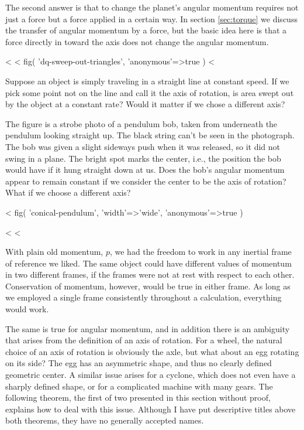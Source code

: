 The second answer is that to change the planet's angular
momentum requires not just a force but a force applied in a
certain way. In section \ref{sec:torque} we discuss the transfer of
angular momentum by a force, but the basic idea here is that
a force directly in toward the axis does not change
the angular momentum.

\startdqs

<%
<%
  fig(
    'dq-sweep-out-triangles',
    {
      'anonymous'=>true
    }
  )
<%
\begin{dq}\label{dq:sweep-out-triangles}
Suppose an object is simply traveling in a straight line
at constant speed. If we pick some point not on the line and
call it the axis of rotation, is area swept out by the
object at a constant rate? Would it matter if we chose a different axis?
\end{dq}

\begin{dq}\label{dq:conical-pendulum}
The figure is a strobe photo of a pendulum bob,
taken from underneath the pendulum looking straight up. The
black string can't be seen in the photograph. The bob was
given a slight sideways push when it was released, so it did
not swing in a plane. The bright spot marks the center, i.e.,
the position the bob would have if it hung straight down at
us. Does the bob's angular momentum appear to remain
constant if we consider the center to be the axis of
rotation? What if we choose a different axis?
\end{dq}

<%
  fig(
    'conical-pendulum',
    {
      'width'=>'wide',
      'anonymous'=>true
    }
  )

<%
<%

With plain old momentum, $p$, we had the freedom to work in
any inertial frame of reference we liked. The same object
could have different values of momentum in two different
frames, if the frames were not at rest with respect to each
other. Conservation of momentum, however, would be true in
either frame. As long as we employed a single frame
consistently throughout a calculation, everything would work.

The same is true for angular momentum, and in addition there
is an ambiguity that arises from the definition of an axis
of rotation. For a wheel, the natural choice of an axis of
rotation is obviously the axle, but what about an egg
rotating on its side? The egg has an asymmetric shape, and
thus no clearly defined geometric center. A similar issue
arises for a cyclone, which does not even have a sharply
defined shape, or for a complicated machine with many gears.
The following theorem, the first of two presented in this
section without proof, explains how to deal with this issue.
Although I have put descriptive titles above both theorems,
they have no generally accepted names.

